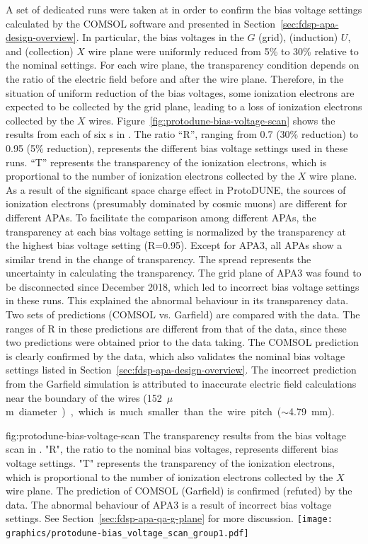 A set of dedicated runs were taken at  in order to confirm the bias voltage settings calculated by the COMSOL software %
and presented in Section~\ref{sec:fdsp-apa-design-overview}. In particular, the bias voltages in the $G$ (grid), (induction) $U$, and (collection) $X$ wire plane were uniformly reduced from 5\% to 30\% relative to the nominal settings. For each wire plane, the transparency condition depends on the ratio of the electric field before and after the wire plane. Therefore, in the situation of uniform reduction of the bias voltages, some ionization electrons are expected to be collected by the grid plane, leading to a loss of ionization electrons collected by the $X$ wires. Figure~\ref{fig:protodune-bias-voltage-scan} shows the results from each of six s in . The ratio ``R'', ranging from 0.7 (30\% reduction) to 0.95 (5\% reduction), represents the different bias voltage settings used in these runs. ``T'' represents the transparency of the ionization electrons, which is proportional to the number of ionization electrons collected by the $X$ wire plane. As a result of the significant space charge effect in ProtoDUNE, the sources of ionization electrons (presumably dominated by cosmic muons) are different for different APAs. To facilitate the comparison among different APAs, the transparency at each bias voltage setting is normalized by the transparency at the highest bias voltage setting (R=0.95). Except for APA3, all APAs show a similar trend in the change of transparency. The spread represents the uncertainty in calculating the transparency. The grid plane of APA3 was found to be disconnected since December 2018, which led to incorrect bias voltage settings in these runs. This explained the abnormal behaviour in its transparency data. Two sets of predictions (COMSOL vs. Garfield) are compared with the  data. The ranges of R in these predictions are different from that of the  data, since these two predictions were obtained prior to the  data taking. The COMSOL prediction is clearly confirmed by the  data, which also validates the nominal bias voltage settings listed in Section~\ref{sec:fdsp-apa-design-overview}. The incorrect prediction from the Garfield simulation is attributed to inaccurate electric field calculations near the boundary of the wires (\SI{152}{$\mu$m} diameter), which is much smaller than the wire pitch ($\sim$\SI{4.79}{mm}). 

\begin{dunefigure}{fig:protodune-bias-voltage-scan}
{The transparency results from the bias voltage scan in . "R", the ratio to the nominal bias voltages, represents different bias voltage settings. "T" represents the transparency of the ionization electrons, which is proportional to the number of ionization electrons collected by the $X$ wire plane. The prediction of COMSOL (Garfield) is confirmed (refuted) by the  data. The abnormal behaviour of APA3 is a result of incorrect bias voltage settings. See Section~\ref{sec:fdsp-apa-qa-g-plane} for more discussion.}
\texttt{[image: graphics/protodune-bias\_voltage\_scan\_group1.pdf]}   
\end{dunefigure}

